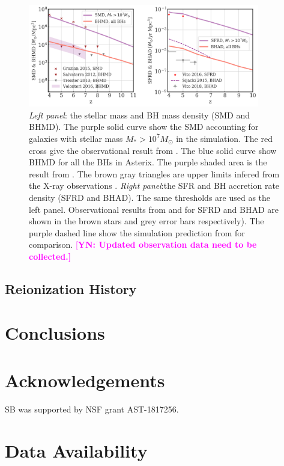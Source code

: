 \documentclass[fleqn,usenatbib]{mnras}
\newcommand{\yueying}[1]{\textcolor{magenta}{[\bf YN: #1]}}
\begin{document}
\begin{figure}
\centering
  \includegraphics[width=0.9\textwidth]{plots/Global-density-hist.png}
  \caption{\textit{Left panel}: the stellar mass and BH mass density (SMD and BHMD).
  The purple solid curve show the SMD accounting for galaxies with stellar mass $M_{*} > 10^7 M_{\odot}$ in the simulation.
  The red cross give the observational result from \citet{Grazian2015}.
  The blue solid curve show BHMD for all the BHs in Asterix.
  The purple shaded area is the result from \citet{Volonteri2016}.
  The brown gray triangles are upper limits infered from the X-ray observations \citet{Salvaterra2012,Treister2013}.
  \textit{Right panel}:the SFR and BH accretion rate density (SFRD and BHAD).
  The same thresholds are used as the left panel. Observational results from \citet{Vito2016} and \citet{Vito2018} for SFRD and BHAD are shown in the brown stars and grey error bars respectively). The purple dashed line show the simulation prediction from \citet{Sijacki2015} for comparison. \yueying{Updated observation data need to be collected.}}
  \label{fig:Global-density}
\end{figure}

\subsection{Reionization History}

\section{Conclusions}


\section*{Acknowledgements}

SB was supported by NSF grant AST-1817256.

\section*{Data Availability}
\end{document}
